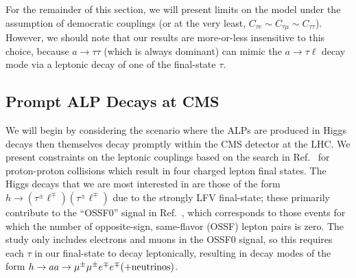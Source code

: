 For the remainder of this section, we will present limits on the model under the assumption of democratic couplings (or at the very least, $C_{\tau e}\sim C_{\tau \mu}\sim C_{\tau\tau}$). However, we should note that our results are more-or-less insensitive to this choice, because $a \rightarrow \tau \tau$ (which is always dominant) can mimic the $a \rightarrow \tau \ell$ decay mode via a leptonic decay of one of the final-state $\tau$. 

\subsection{Prompt ALP Decays at CMS}\label{sec:higgs_decay_CMS}
We will begin by considering the scenario where the ALPs are produced in Higgs decays then themselves decay promptly within the CMS detector at the LHC. We present constraints on the leptonic couplings based on the search in Ref.~\cite{CMS:2019lwf} for proton-proton collisions which result in four charged lepton final states. The Higgs decays that we are most interested in are those of the form $h \rightarrow (\tau^\pm  \ell^\mp)(\tau^\pm \ell^\mp)$ due to the strongly LFV final-state; these primarily contribute to the ``OSSF0'' signal in Ref.~\cite{CMS:2019lwf}, which corresponds to those events for which the number of opposite-sign, same-flavor (OSSF) lepton pairs is zero. The study only includes electrons and muons in the OSSF0 signal, so this requires each $\tau$ in our final-state to decay leptonically, resulting in decay modes of the form $h\rightarrow aa \rightarrow \mu^\pm \mu^\pm e^\mp e^\mp (+ {\rm neutrinos})$.

